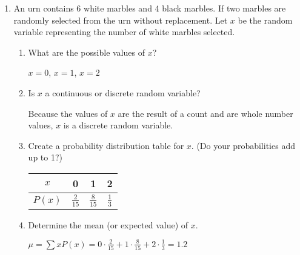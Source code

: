\documentclass{article}
\newcommand{\answer}[1]{\color{white}#1}
\begin{document}
\pagestyle{myheadings}

\begin{center}
\textbf{}
\end{center}

\begin{enumerate}
	

\item An urn contains 6 white marbles and 4 black marbles.  If two marbles are randomly selected from the urn without replacement.  Let $x$ be the random variable representing the number of white marbles selected.
	\begin{enumerate}
	\item What are the possible values of $x$? 
	
	{\answer $x=0$, $x=1$, $x=2$}
	
	\vspace{0.5cm}
	
	\item Is $x$ a continuous or discrete random variable? 
	
	{\answer Because the values of $x$ are the result of a count and are whole number values, $x$ is a discrete random variable.}
	
	\vspace{0.5cm}
	
	\item Create a probability distribution table for $x$.  (Do your probabilities add up to 1?) 
	
	\begin{tabular}{c|c|c|c|}
	$x$ & \hspace{0.25cm} {\answer 0} \hspace{0.25cm} & \hspace{0.25cm} {\answer 1} \hspace{0.25cm} & \hspace{0.25cm} {\answer 2} \hspace{0.25cm} \\
	\hline
	$P(x)$ & {\answer  $\frac{2}{15}$} &  {\answer $\frac{8}{15}$} & {\answer $\frac{1}{3}$}  \\
	\end{tabular}
	\vspace{1cm}
	
	\item  Determine the mean (or expected value) of $x$. 
	
	{\answer $\mu = \sum xP(x) = 0\cdot \frac{2}{15} + 1\cdot \frac{8}{15} + 2\cdot \frac{1}{3} = 1.2$
	} 
	

\end{enumerate}
\end{enumerate}
\end{document}
